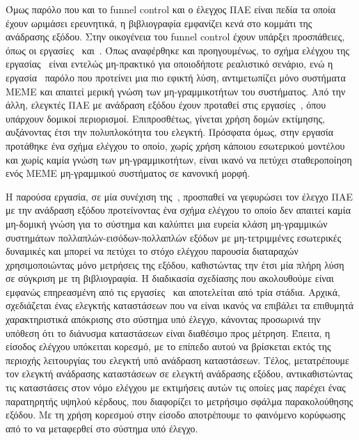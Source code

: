 Όμως παρόλο που και το \textlatin{funnel control} και ο έλεγχος ΠΑΕ είναι πεδία τα οποία έχουν ωριμάσει ερευνητικά, η βιβλιογραφία εμφανίζει κενά στο κομμάτι της ανάδρασης εξόδου. Στην οικογένεια του \textlatin{funnel control} έχουν υπάρξει προσπάθειες, όπως οι εργασίες~\cite{ilchmann2007tracking} και~\cite{chowdhury2017funnel}. Όπως αναφέρθηκε και προηγουμένως, το σχήμα ελέγχου της εργασίας~\cite{ilchmann2007tracking} είναι εντελώς μη-πρακτικό για οποιοδήποτε ρεαλιστικό σενάριο, ενώ η εργασία~\cite{chowdhury2017funnel} παρόλο που προτείνει μια πιο εφικτή λύση, αντιμετωπίζει μόνο συστήματα MEME και απαιτεί μερική γνώση των μη-γραμμικοτήτων του συστήματος. Από την άλλη, ελεγκτές ΠΑΕ με ανάδραση εξόδου έχουν προταθεί στις εργασίες~\cite{kostarigka2009approximate, kostarigka2012adaptive}, όπου υπάρχουν δομικοί περιορισμοί. Επιπροσθέτως, γίνεται χρήση δομών εκτίμησης, αυξάνοντας έτσι την πολυπλοκότητα του ελεγκτή. Πρόσφατα όμως, στην εργασία~\cite{bechlioulis2013output} προτάθηκε ένα σχήμα ελέγχου το οποίο, χωρίς χρήση κάποιου εσωτερικού μοντέλου και χωρίς καμία γνώση των μη-γραμμικοτήτων, είναι ικανό να πετύχει σταθεροποίηση ενός ΜΕΜΕ μη-γραμμικού συστήματος σε κανονική μορφή.

H παρούσα εργασία, σε μία συνέχιση της~\cite{bechlioulis2013output}, προσπαθεί να γεφυρώσει τον έλεγχο ΠΑΕ με την ανάδραση εξόδου προτείνοντας ένα σχήμα ελέγχου το οποίο δεν απαιτεί καμία μη-δομική γνώση για το σύστημα και καλύπτει μια ευρεία κλάση μη-γραμμικών συστημάτων πολλαπλών-εισόδων-πολλαπλών εξόδων με μη-τετριμμένες εσωτερικές δυναμικές και μπορεί να πετύχει το στόχο ελέγχου παρουσία διαταραχών χρησιμοποιώντας μόνο μετρήσεις της εξόδου, καθιστώντας την έτσι μία πλήρη λύση σε σύγκριση με τη βιβλιογραφία. Η διαδικασία σχεδίασης που ακολουθούμε είναι εμφανώς επηρεασμένη από τις εργασίες~\cite{atassi1999separation,atassi2001separation,khalil1996noninear} και αποτελείται από τρία στάδια. Αρχικά, σχεδιάζεται ένας ελεγκτής καταστάσεων που να είναι ικανός να επιβάλει τα επιθυμητά χαρακτηριστικά απόκρισης στο σύστημα υπό έλεγχο, κάνοντας προσωρινά την υπόθεση ότι το διάνυσμα καταστάσεων είναι διαθέσιμο προς μέτρηση. Έπειτα, η είσοδος ελέγχου υπόκειται κορεσμό, με το επίπεδο αυτού να βρίσκεται εκτός της περιοχής λειτουργίας του ελεγκτή υπό ανάδραση καταστάσεων. Τέλος, μετατρέπουμε τον ελεγκτή ανάδρασης καταστάσεων σε ελεγκτή ανάδρασης εξόδου, αντικαθιστώντας τις καταστάσεις στον νόμο ελέγχου με εκτιμήσεις αυτών τις οποίες μας παρέχει ένας παρατηρητής υψηλού κέρδους, που διαφορίζει το μετρήσιμο σφάλμα παρακολούθησης εξόδου. Με τη χρήση κορεσμού στην είσοδο αποτρέπουμε το φαινόμενο κορύφωσης από το να μεταφερθεί στο σύστημα υπό έλεγχο. 

